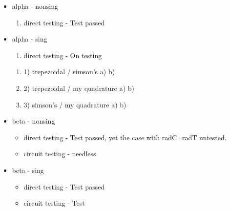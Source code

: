 \begin{itemize}
\item alpha - nonsing
    \begin{enumerate}
    \item direct testing - Test passed
    \end{enumerate}
\item alpha - sing
    \begin{enumerate}
    \item direct testing - On testing
    \end{enumerate}
        \begin{enumerate}
        \item 1) trepezoidal / simson's               a) b)
        \item 2) trepezoidal / my quadrature  a) b)
        \item 3) simson's    / my quadrature  a) b)
        \end{enumerate}

\item beta - nonsing
    \begin{itemize}
    \item direct testing - Test passed, yet the case with radC=radT untested.
    \item circuit testing - needless
    \end{itemize}

\item beta - sing
    \begin{itemize}
    \item direct testing - Test passed
    \item circuit testing - Test
    \end{itemize}
\end{itemize}
